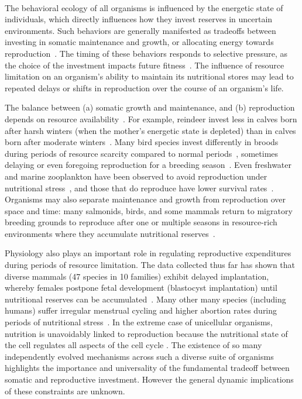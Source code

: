 \documentclass[11pt]{article}
\begin{document}
\begin{multicols}{2}

 \\ 
The behavioral ecology of all organisms is influenced by the energetic state of individuals, which directly influences how they invest reserves in uncertain environments.  
Such behaviors are generally manifested as tradeoffs between investing in somatic maintenance and growth, or allocating energy towards reproduction~\cite{Martin:1987dl,Kirk:1997cc,Kempes:2012hy}.  
The timing of these behaviors responds to selective pressure, as the choice of the investment impacts future fitness~\cite{Mangel:1988uaa,Mangel:2014kz,Yeakel:2013hi}.  
The influence of resource limitation on an organism's ability to maintain its nutritional stores may lead to repeated delays or shifts in reproduction over the course of an organism's life.

The balance between (a) somatic growth and maintenance, and (b) reproduction depends on resource availability~\cite{Morris:1987eo}.  
For example, reindeer invest less in calves born after harsh winters (when the mother's energetic state is depleted) than in calves born after moderate winters~\cite{Tveraa:2003fq}.  
Many bird species invest differently in broods during periods of resource scarcity compared to normal periods~\cite{Daan:1988va,Jacot:2009dv}, sometimes delaying or even foregoing reproduction for a breeding season~\cite{Martin:1987dl,Stearns:1989ip,Barboza:2002in}.  
Even freshwater and marine zooplankton have been observed to avoid reproduction under nutritional stress~\cite{Threlkeld:1976ih}, and those that do reproduce have lower survival rates~\cite{Kirk:1997cc}. 
Organisms may also separate maintenance and growth from reproduction over space and time: many salmonids, birds, and some mammals return to migratory breeding grounds to reproduce after one or multiple seasons in resource-rich environments where they accumulate nutritional reserves~\cite{Weber:1998jg,Mduma:1999cp,Moore:2014hi}.

Physiology also plays an important role in regulating reproductive expenditures during periods of resource limitation.  
The data collected thus far has shown that diverse mammals (47 species in 10 families) exhibit delayed implantation, whereby females postpone fetal development (blastocyst implantation) until nutritional reserves can be accumulated~\cite{Mead:1989dt,Sandell:1990kw}.  
Many other many species (including humans) suffer irregular menstrual cycling and higher abortion rates during periods of nutritional stress~\cite{Bulik:1999eo,Trites:2003cc}.  
In the extreme case of unicellular organisms, nutrition is unavoidably linked to reproduction because the nutritional state of the cell regulates all aspects of the cell cycle \cite{Glazier:2009hq}.  
The existence of so many independently evolved mechanisms across such a diverse suite of organisms highlights the importance and universality of the fundamental tradeoff between somatic and reproductive investment.  
However the general dynamic implications of these constraints are unknown.


\end{multicols}
\end{document}
